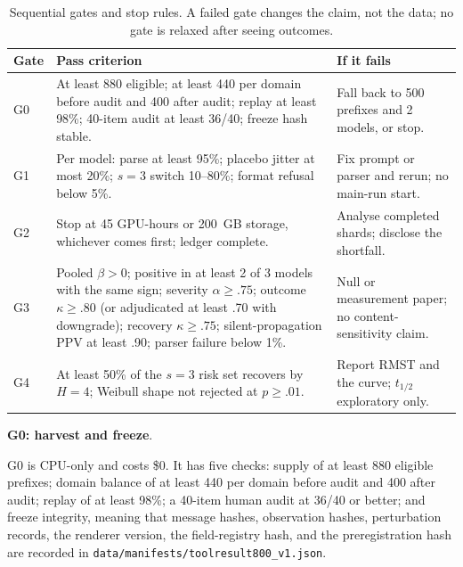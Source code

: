 \documentclass[a4paper,fleqn]{cas-sc}
\begin{document}
\begin{table}[pos=htbp]
  \centering
  \caption{Sequential gates and stop rules. A failed gate changes the claim, not the data; no
  gate is relaxed after seeing outcomes.}
  \label{tab:gates}
  \footnotesize
  \setlength{\tabcolsep}{4pt}
  \begin{tabular}{>{\raggedright\arraybackslash}p{0.9cm}>{\raggedright\arraybackslash}p{9.6cm}>{\raggedright\arraybackslash}p{4.2cm}}
    \toprule
    \textbf{Gate} & \textbf{Pass criterion} & \textbf{If it fails} \\
    \midrule
    G0 & At least 880 eligible; at least 440 per domain before audit and 400 after audit; replay at least 98\%; 40-item audit at least 36/40; freeze hash stable. & Fall back to 500 prefixes and 2 models, or stop. \\
    G1 & Per model: parse at least 95\%; placebo jitter at most 20\%; $s=3$ switch 10--80\%; format refusal below 5\%. & Fix prompt or parser and rerun; no main-run start. \\
    G2 & Stop at 45 GPU-hours or 200~GB storage, whichever comes first; ledger complete. & Analyse completed shards; disclose the shortfall. \\
    G3 & Pooled $\beta>0$; positive in at least 2 of 3 models with the same sign; severity $\alpha \ge .75$; outcome $\kappa \ge .80$ (or adjudicated at least .70 with downgrade); recovery $\kappa \ge .75$; silent-propagation PPV at least .90; parser failure below 1\%. & Null or measurement paper; no content-sensitivity claim. \\
    G4 & At least 50\% of the $s=3$ risk set recovers by $H=4$; Weibull shape not rejected at $p \ge .01$. & Report RMST and the curve; $t_{1/2}$ exploratory only. \\
    \bottomrule
  \end{tabular}
\end{table}

\noindent\textbf{G0: harvest and freeze}.\

G0 is CPU-only and costs \$0. It has five checks: supply of at least 880 eligible prefixes;
domain balance of at least 440 per domain before audit and 400 after audit; replay of at least
98\%; a 40-item human audit at 36/40 or better; and freeze integrity, meaning that message hashes,
observation hashes, perturbation records, the renderer version, the field-registry hash, and the
preregistration hash are recorded in \texttt{data/manifests/toolresult800\_v1.json}.
\end{document}
